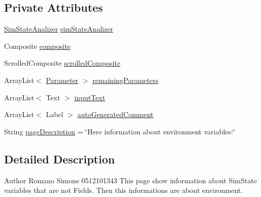 \subsection*{Private Attributes}
\begin{DoxyCompactItemize}
\item 
\hyperlink{classit_1_1isislab_1_1masonassisteddocumentation_1_1mason_1_1analizer_1_1_sim_state_analizer}{Sim\-State\-Analizer} \hyperlink{classit_1_1isislab_1_1masonassisteddocumentation_1_1mason_1_1wizards_1_1_h___environment_page_ab4fc8e47db987a2303bd362dab615f0c}{sim\-State\-Analizer}
\item 
Composite \hyperlink{classit_1_1isislab_1_1masonassisteddocumentation_1_1mason_1_1wizards_1_1_h___environment_page_a08701d3343b8c6232831af0077e6cb37}{composite}
\item 
Scrolled\-Composite \hyperlink{classit_1_1isislab_1_1masonassisteddocumentation_1_1mason_1_1wizards_1_1_h___environment_page_ae9781527e7827259c98bd07246e9cce0}{scrolled\-Composite}
\item 
Array\-List$<$ \hyperlink{classit_1_1isislab_1_1masonassisteddocumentation_1_1mason_1_1analizer_1_1_parameter}{Parameter} $>$ \hyperlink{classit_1_1isislab_1_1masonassisteddocumentation_1_1mason_1_1wizards_1_1_h___environment_page_a5d9563244ed9f8e9a055d1678e29d4f2}{remaining\-Parameters}
\item 
Array\-List$<$ Text $>$ \hyperlink{classit_1_1isislab_1_1masonassisteddocumentation_1_1mason_1_1wizards_1_1_h___environment_page_ae5479b549376ada700ee03c0a23af9b1}{input\-Text}
\item 
Array\-List$<$ Label $>$ \hyperlink{classit_1_1isislab_1_1masonassisteddocumentation_1_1mason_1_1wizards_1_1_h___environment_page_a15a1e1e2224d71f7d9a10f962bbeee8f}{auto\-Generated\-Comment}
\item 
String \hyperlink{classit_1_1isislab_1_1masonassisteddocumentation_1_1mason_1_1wizards_1_1_h___environment_page_a413222a36bc7f7b1c27a00b0c1d7a713}{page\-Description} = \char`\"{}Here information about environment variables\-:\char`\"{}
\end{DoxyCompactItemize}


\subsection{Detailed Description}
\begin{DoxyAuthor}{Author}
Romano Simone 0512101343 This page show information about Sim\-State variables that are not Fields. Then this informations are about environment. 
\end{DoxyAuthor}


